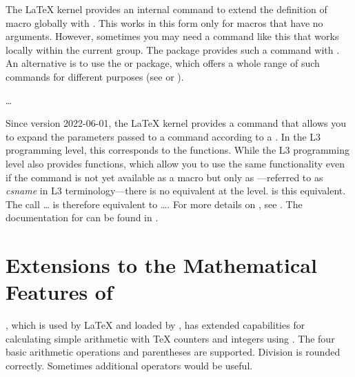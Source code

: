 \begin{Declaration}
\end{Declaration}%
The \LaTeX{} kernel provides an internal command  to
extend the definition of macro  globally with
. This works in this form only for macros that have no
arguments. However, sometimes you may need a command like this that works
locally within the current group. The  package provides such
a command with . An alternative is to use the
 or
 package, which offers a whole range of
such commands for different purposes (see \cite{package:etoolbox} or
\cite{package:xpatch}).%
\EndIndexGroup


\begin{Declaration}
  \dots
\end{Declaration}
Since version 2022-06-01, the \LaTeX{}
kernel provides a  command that allows you to expand the
parameters passed to a command according to a . In the L3
programming level, this corresponds to the 
functions. While the L3 programming level also provides
 functions, which allow you to use the same
functionality even if the command is not yet available as a macro but only as
—referred to as \emph{csname} in L3 terminology—there is
no equivalent at the \LaTeXe{} level.  is this
equivalent. The call
\dots
is therefore equivalent to
\dots. For
more details on , see \cite{latex:usrguide}. The
documentation for  can be found in
\cite{latex:interface3}.%
\EndIndexGroup

\section{Extensions to the Mathematical Features of \eTeX}

\eTeX{}, which is used by \LaTeX{} and loaded by \KOMAScript{}, has extended
capabilities for calculating simple arithmetic with \TeX{} counters and
integers using . The four basic arithmetic
operations and parentheses are supported. Division is rounded
correctly. Sometimes additional operators would be useful.

